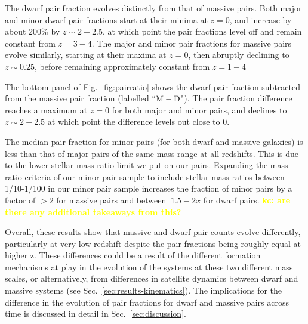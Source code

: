 \documentclass[twocolumn]{aastex631}
\newcommand{\kc}[1]{\textcolor{yellow}{\textbf{kc: #1}} }
\begin{document}
The dwarf pair fraction evolves distinctly from that of massive pairs.
Both major and minor dwarf pair fractions start at their minima at $z=0$, and increase by about 200\% by $z\sim2-2.5$, at which point the pair fractions level off and remain constant from $z=3-4$. 
The major and minor pair fractions for massive pairs evolve similarly, starting at their maxima at $z=0$, then abruptly declining to $z\sim0.25$, before remaining approximately constant from $z=1-4$ %

The bottom panel of Fig.~\ref{fig:pairratio} shows the dwarf pair fraction subtracted from the massive pair fraction (labelled ``$\rm M-D$"). 
The pair fraction difference reaches a maximum at $z=0$ for both major and minor pairs, and declines to $z\sim2-2.5$ at which point the difference levels out close to 0. 

The median pair fraction for minor pairs (for both dwarf and massive galaxies) is less than that of major pairs of the same mass range at all redshifts. This is due to the lower stellar mass ratio limit we put on our pairs. 
Expanding the mass ratio criteria of our minor pair sample to include stellar mass ratios between 1/10-1/100 in our minor pair sample increases the fraction of minor pairs by a factor of $>2$ for massive pairs and between $~1.5-2x$ for dwarf pairs. \kc{are there any additional takeaways from this? }

Overall, these results show that massive and dwarf pair counts evolve differently, particularly at very low redshift despite the pair fractions being roughly equal at higher z. 
These differences could be a result of the different formation mechanisms at play in the evolution of the systems at these two different mass scales, or alternatively, from differences in satellite dynamics between dwarf and massive systems (see Sec.~\ref{sec:results-kinematics}). 
The implications for the difference in the evolution of pair fractions for dwarf and massive pairs across time is discussed in detail in Sec.~\ref{sec:discussion}.
\end{document}

